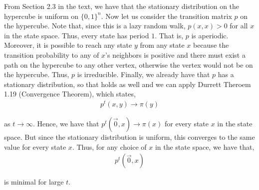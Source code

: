 \documentclass[12pt]{article}
\newenvironment{problem}[2][Problem]{\begin{trivlist}
\item[\hskip \labelsep {\bfseries #1}\hskip \labelsep {\bfseries #2.}]}{\end{trivlist}}
\begin{document}
From Section 2.3 in the text, we have that the stationary distribution on the hypercube is uniform on $\{0, 1\}^n$.  Now let us consider the transition matrix $p$ on the hypercube. Note that, since this is a lazy random walk, $p(x, x) > 0$ for all $x$ in the state space. Thus, every state has period $1$. That is, $p$ is aperiodic. Moreover, it is possible to reach any state $y$ from any state $x$ because the transition probability to any of $x$'s neighbors is positive and there must exist a path on the hypercube to any other vertex, otherwise the vertex would not be on the hypercube. Thus, $p$ is irreducible. Finally, we already have that $p$ has a stationary distribution, so that holds as well and we can apply Durrett Theroem 1.19 (Convergence Theorem), which states,
\begin{align*}
p^t(x,y) \to \pi(y)
\end{align*}

as $t \to \infty$. Hence, we have that $p^t(\vec{0}, x) \to \pi(x)$ for every state $x$ in the state space. But since the stationary distribution is uniform, this converges to the same value for every state $x$. Thus, for any choice of $x$ in the state space, we have that,
\begin{align*}
p^t(\vec{0}, x)
\end{align*}

is minimal for large $t$.

\begin{problem}{III}
\end{problem}

\begin{problem}{IV}
\end{problem}
\end{document}

